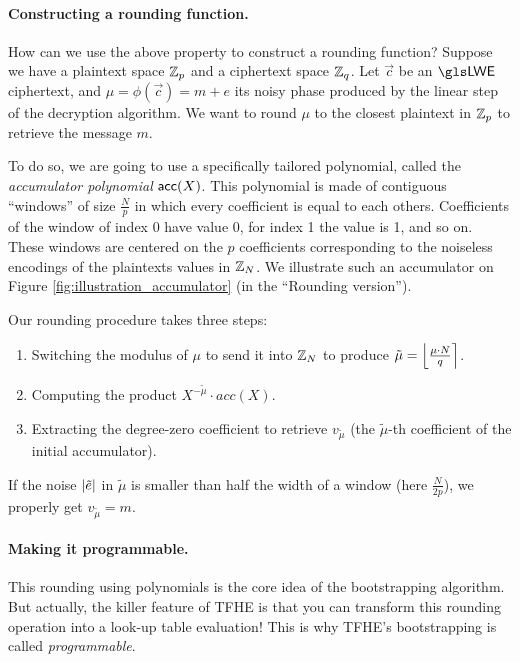 \paragraph{Constructing a rounding function.}
How can we use the above property to construct a rounding function? Suppose we have a plaintext space $\mathbb{Z}_p$ and a ciphertext space $\mathbb{Z}_q$. Let $\vec c$ be  an $\LWE$ ciphertext, and $\mu = \phi(\vec c) = m + e$ its noisy phase produced by the linear step of the decryption algorithm. We want to round $\mu$ to the closest plaintext in $\mathbb{Z}_p$ to retrieve the message $m$.

To do so, we are going to use a specifically tailored polynomial, called the \textit{accumulator polynomial} $\textsf{acc}(X)$. This polynomial is made of contiguous ``windows'' of size $\frac N p$ in which every coefficient is equal to each others. Coefficients of the window of index 0 have value 0, for index 1 the value is 1, and so on. These windows are centered on the $p$ coefficients corresponding to the noiseless encodings of the plaintexts values in $\mathbb{Z}_N$. We illustrate such an accumulator on Figure \ref{fig:illustration_accumulator} (in the ``Rounding version'').



Our rounding procedure takes three steps:

\begin{enumerate}%
	\item Switching the modulus of $\mu$ to send it into $\mathbb{Z}_N$ to produce $\tilde \mu = \left \lfloor \frac{\mu \cdot N}{q} \right \rceil$.
	\item Computing the product $X^{- \tilde \mu} \cdot acc(X)$.
	\item Extracting the degree-zero coefficient to retrieve $v_{\tilde \mu}$ (the $\tilde{\mu}$-th coefficient of the initial accumulator).
\end{enumerate}

If the noise $\left \lvert \tilde e \right \rvert$ in $\tilde \mu$ is smaller than half the width of a window (here $\frac{N}{2p}$), we properly get $v_{\tilde \mu} = m$. 

\paragraph{Making it programmable.}
This rounding using polynomials is the core idea of the bootstrapping algorithm. But actually, the killer feature of \gls{TFHE} is that you can transform this rounding operation into a look-up table evaluation! This is why \gls{TFHE}'s bootstrapping is called \textit{programmable}.

